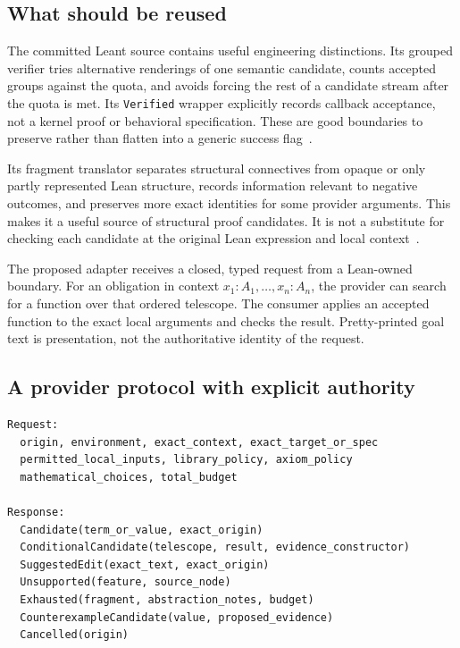 \documentclass[11pt,a4paper]{article}
\newcommand{\code}[1]{\nolinkurl{#1}}
\theoremstyle{definition}
\begin{document}
\subsection{What should be reused}
The committed Leant source contains useful engineering distinctions. Its grouped verifier tries alternative renderings of one semantic candidate, counts accepted groups against the quota, and avoids forcing the rest of a candidate stream after the quota is met. Its \code{Verified} wrapper explicitly records callback acceptance, not a kernel proof or behavioral specification. These are good boundaries to preserve rather than flatten into a generic success flag~\cite{lverify}.

Its fragment translator separates structural connectives from opaque or only partly represented Lean structure, records information relevant to negative outcomes, and preserves more exact identities for some provider arguments. This makes it a useful source of structural proof candidates. It is not a substitute for checking each candidate at the original Lean expression and local context~\cite{lfragment}.

The proposed adapter receives a closed, typed request from a Lean-owned boundary. For an obligation in context \(x_1:A_1,\ldots,x_n:A_n\), the provider can search for a function over that ordered telescope. The consumer applies an accepted function to the exact local arguments and checks the result. Pretty-printed goal text is presentation, not the authoritative identity of the request.

\subsection{A provider protocol with explicit authority}
\par\noindent\begin{minipage}{\linewidth}
\begin{lstlisting}
Request:
  origin, environment, exact_context, exact_target_or_spec
  permitted_local_inputs, library_policy, axiom_policy
  mathematical_choices, total_budget

Response:
  Candidate(term_or_value, exact_origin)
  ConditionalCandidate(telescope, result, evidence_constructor)
  SuggestedEdit(exact_text, exact_origin)
  Unsupported(feature, source_node)
  Exhausted(fragment, abstraction_notes, budget)
  CounterexampleCandidate(value, proposed_evidence)
  Cancelled(origin)
\end{lstlisting}
\end{minipage}\par
\end{document}
